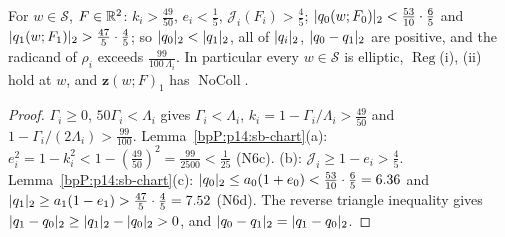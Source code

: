 \begin{lemma}\label{bpP:p14:sb-S}
For $w\in\mathcal S$, $F\in\mathbb{R}^2$: $k_i>\frac{49}{50}$, $e_i<\frac15$, $\mathcal J_i(F_i)>\frac45$; $\lvert q_0(w;F_0)\rvert_2<\frac{53}{10}\cdot\frac65$ and $\lvert q_1(w;F_1)\rvert_2>\frac{47}5\cdot\frac45$; so $\lvert q_0\rvert_2<\lvert q_1\rvert_2$, all of $\lvert q_i\rvert_2$, $\lvert q_0-q_1\rvert_2$ are positive, and the radicand of $\rho_i$ exceeds $\frac{99}{100\,\Lambda_i}$. In particular every $w\in\mathcal S$ is elliptic, $\operatorname{Reg}$(i), (ii) hold at $w$, and $\mathbf z(w;F)_1$ has $\operatorname{NoColl}$.
\end{lemma}
\begin{proof}
\label{stepP:p14:sb-S-1} $\Gamma_i\ge0$, $50\Gamma_i<\Lambda_i$ gives $\Gamma_i<\Lambda_i$, $k_i=1-\Gamma_i/\Lambda_i>\frac{49}{50}$ and $1-\Gamma_i/(2\Lambda_i)>\frac{99}{100}$.
\label{stepP:p14:sb-S-2} Lemma~\ref{bpP:p14:sb-chart}(a): $e_i^2=1-k_i^2<1-(\frac{49}{50})^2=\frac{99}{2500}<\frac1{25}$ (N6c). (b): $\mathcal J_i\ge1-e_i>\frac45$.
\label{stepP:p14:sb-S-3} Lemma~\ref{bpP:p14:sb-chart}(c): $\lvert q_0\rvert_2\le a_0(1+e_0)<\frac{53}{10}\cdot\frac65=6.36$ and $\lvert q_1\rvert_2\ge a_1(1-e_1)>\frac{47}5\cdot\frac45=7.52$ (N6d). The reverse triangle inequality gives $\lvert q_1-q_0\rvert_2\ge\lvert q_1\rvert_2-\lvert q_0\rvert_2>0$, and $\lvert q_0-q_1\rvert_2=\lvert q_1-q_0\rvert_2$.
\end{proof}

